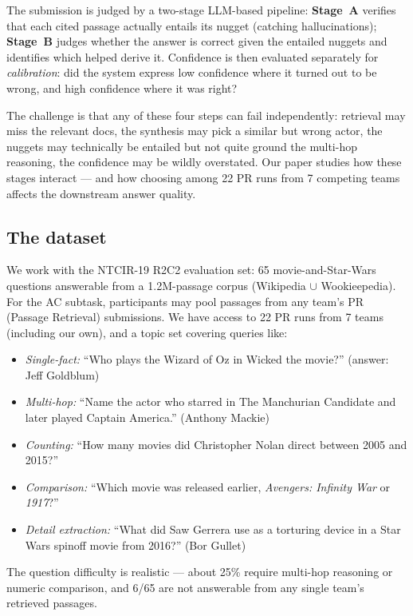 \documentclass[11pt,a4paper]{article}
\begin{document}
\noindent The submission is judged by a two-stage LLM-based pipeline:
\textbf{Stage~A} verifies that each cited passage actually entails its
nugget (catching hallucinations); \textbf{Stage~B} judges whether the
answer is correct given the entailed nuggets and identifies which
helped derive it. Confidence is then evaluated separately for
\emph{calibration}: did the system express low confidence where it
turned out to be wrong, and high confidence where it was right?

The challenge is that any of these four steps can fail independently:
retrieval may miss the relevant docs, the synthesis may pick a similar
but wrong actor, the nuggets may technically be entailed but not
quite ground the multi-hop reasoning, the confidence may be wildly
overstated. Our paper studies how these stages interact — and how
choosing among 22 PR runs from 7 competing teams affects the
downstream answer quality.

\subsection{The dataset}

We work with the NTCIR-19 R2C2 evaluation set: 65 movie-and-Star-Wars
questions answerable from a 1.2M-passage corpus (Wikipedia $\cup$
Wookieepedia). For the AC subtask, participants may pool passages from
any team's PR (Passage Retrieval) submissions. We have access to 22
PR runs from 7 teams (including our own), and a topic set covering
queries like:

\begin{itemize}[itemsep=0.2em]
  \item \emph{Single-fact:} ``Who plays the Wizard of Oz in Wicked the movie?''
    (answer: Jeff Goldblum)
  \item \emph{Multi-hop:} ``Name the actor who starred in The Manchurian
    Candidate and later played Captain America.'' (Anthony Mackie)
  \item \emph{Counting:} ``How many movies did Christopher Nolan direct
    between 2005 and 2015?''
  \item \emph{Comparison:} ``Which movie was released earlier,
    \textit{Avengers: Infinity War} or \textit{1917}?''
  \item \emph{Detail extraction:} ``What did Saw Gerrera use as a
    torturing device in a Star Wars spinoff movie from 2016?'' (Bor Gullet)
\end{itemize}

The question difficulty is realistic — about 25\% require multi-hop
reasoning or numeric comparison, and 6/65 are not answerable from any
single team's retrieved passages.
\end{document}
